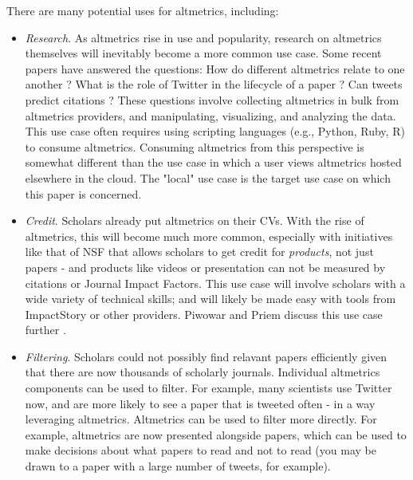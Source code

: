 \documentclass[letterpaper,superscriptaddress,showkeys,longbibliography]{revtex4-1}\usepackage{graphicx, color}
\begin{document}
There are many potential uses for altmetrics, including: 

\begin{itemize}
  \item \emph{Research}. As altmetrics rise in use and popularity, research on altmetrics themselves will inevitably become a more common use case. Some recent papers have answered the questions: How do different altmetrics relate to one another \cite{yan2011,bollen2009}? What is the role of Twitter in the lifecycle of a paper \cite{darling2013}? Can tweets predict citations \cite{eysenbach2011,thelwall2013}? These questions involve collecting altmetrics in bulk from altmetrics providers, and manipulating, visualizing, and analyzing the data. This use case often requires using scripting languages (e.g., Python, Ruby, R) to consume altmetrics. Consuming altmetrics from this perspective is somewhat different than the use case in which a user views altmetrics hosted elsewhere in the cloud. The "local" use case is the target use case on which this paper is concerned. 
  \item \emph{Credit}. Scholars already put altmetrics on their CVs. With the rise of altmetrics, this will become much more common, especially with initiatives like that of NSF that allows scholars to get credit for \emph{products}, not just papers - and products like videos or presentation can not be measured by citations or Journal Impact Factors. This use case will involve scholars with a wide variety of technical skills; and will likely be made easy with tools from ImpactStory or other providers. Piwowar and Priem discuss this use case further \cite{piwowar2013power}. 
  \item \emph{Filtering}. Scholars could not possibly find relavant papers efficiently given that there are now thousands of scholarly journals. Individual altmetrics components can be used to filter. For example, many scientists use Twitter now, and are more likely to see a paper that is tweeted often - in a way leveraging altmetrics. Altmetrics can be used to filter more directly. For example, altmetrics are now presented alongside papers, which can be used to make decisions about what papers to read and not to read (you may be drawn to a paper with a large number of tweets, for example).
\end{itemize}

\end{document}
